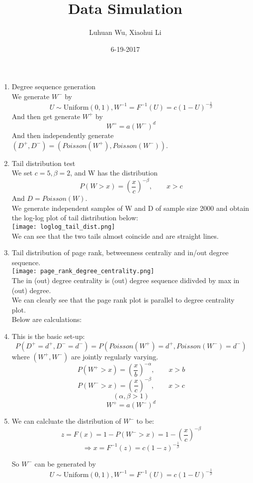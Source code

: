 \documentclass{article}
\title{Data Simulation}
\author{\vspace{-6ex} Luhuan Wu, Xiaohui Li}
\date{6-19-2017}
\begin{document}
\maketitle
\begin{enumerate}

\item Degree sequence generation\\
We generate $W^-$ by 
$$U \sim \text{Uniform}(0, 1), W^{-1}=F^{-1}(U)=c(1-U)^{-\frac{1}{\beta}}$$
And then get generate $W^+$ by
$$W^= = a(W^-)^d$$
And then independently generate $(D^+, D^-) = (Poisson(W^+), Poisson(W^-))$.

\item Tail distribution test\\
We set $c = 5, \beta = 2$, and W has the distribution 
$$P(W> x) = (\frac{x}{c})^{-\beta}, \qquad x >c$$
And $D = Poisson(W)$. \\
We generate independent samples of W and D of sample size 2000 and obtain the log-log plot of tail distribution below:\\
\texttt{[image: loglog\_tail\_dist.png]}
\\
We can see that the two tails almost coincide and are straight lines.
\item Tail distribution of page rank, betweenness centraliy and in/out degree sequence.\\
\texttt{[image: page\_rank\_degree\_centrality.png]}
\\
The in (out) degree centrality is (out) degree sequence didivded by max in (out) degree.\\
We can clearly see that the page rank plot is parallel to degree centrality plot.\\

Below are calculations:
\item
This is the basic set-up:
$$P(D^+ = d^+, D^- = d^-) = P(Poisson(W^+) = d^+, Poisson(W^-)=d^-)$$
where $(W^+,W^-)$  are jointly regularly varying.
$$P(W^+ > x) = (\frac{x}{b})^{-\alpha},\qquad x >b$$
$$P(W^- > x) = (\frac{x}{c})^{-\beta}, \qquad x >c $$
$$ (\alpha, \beta > 1)$$
$$W^+ = a(W^-)^d$$

\item
We can calcluate the distribution of $W^{-}$ to be:
$$z=F(x) =1-P(W^->x)=1-(\frac{x}{c})^{-\beta}$$
$$\Rightarrow x=F^{-1}(z)=c(1-z)^{-\frac{1}{\beta}}$$

So $W^{-}$ can be generated by
$$U \sim \text{Uniform}(0, 1), W^{-1}=F^{-1}(U)=c(1-U)^{-\frac{1}{\beta}}$$
 

\end{enumerate}
\end{document}
